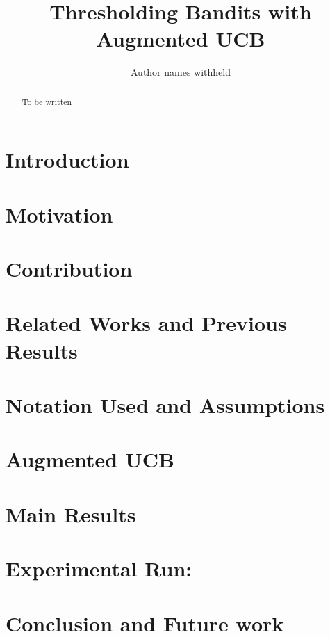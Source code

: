 \documentclass{article}
\title{Thresholding Bandits with Augmented UCB}
\author{Author names withheld}
\begin{document}
\maketitle

\begin{abstract}
To be written
\end{abstract}


\section{Introduction}
\label{intro}


\section{Motivation}
\label{motivation}



\section{Contribution}
\label{contribution}


\section{Related Works and Previous Results}
\label{prevRes}


\section{Notation Used and Assumptions}
\label{notation}



\section{Augmented UCB}
\label{algo}


\section{Main Results}
\label{results}



\section{Experimental Run:}
\label{expt}



\section{Conclusion and Future work}
\label{conclusion}







%
\end{document}

